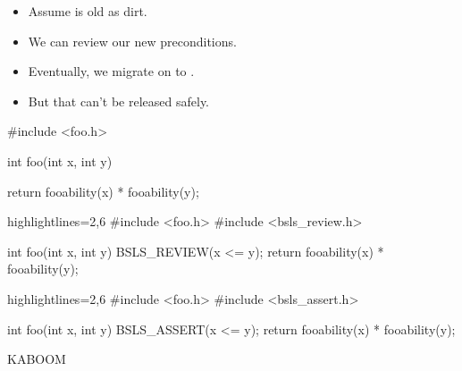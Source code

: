 \begin{frame}[fragile]
\begin{overprint}
  \begin{itemize}
  \item<1->{Assume  is old as dirt.}
  \item<2->{We can review our new preconditions.}
  \item<3->{Eventually, we migrate on to .}
  \item<4->{But that can't be released safely.}
  \end{itemize}
\end{overprint}

\begin{overprint}
\begin{cppcodebox}
#include <foo.h>
  

int foo(int x, int y)
{

  return fooability(x) * fooability(y);
}  
\end{cppcodebox}

\begin{cppcodebox*}{highlightlines={2,6}}
#include <foo.h>
#include <bsls\_review.h>
  
int foo(int x, int y)
{
  BSLS_REVIEW(x <= y);
  return fooability(x) * fooability(y);
}  
\end{cppcodebox*}

\begin{cppcodebox*}{highlightlines={2,6}}
#include <foo.h>
#include <bsls\_assert.h>
  
int foo(int x, int y)
{
  BSLS_ASSERT(x <= y);
  return fooability(x) * fooability(y);
}  
\end{cppcodebox*}

KABOOM

\end{overprint}
\end{frame}


